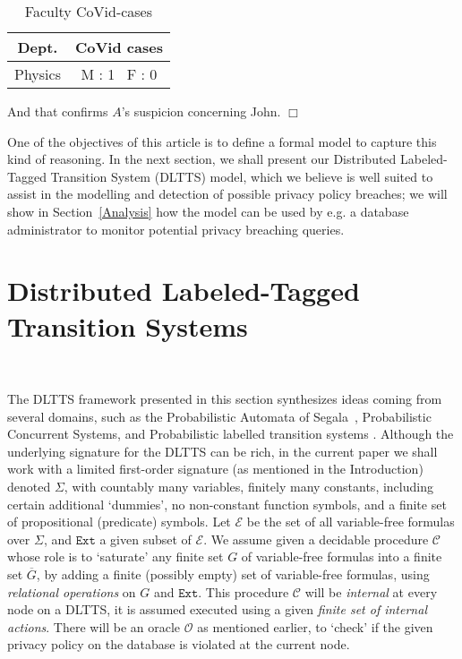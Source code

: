 \documentclass[pdflatex]{article}
\def \C {{\mathcal{C}}}
\def \E {{\mathcal{E}}}
\def \o {{\mathcal{O}}}
\def \lft {\noindent}
\def \ovr {\overline}
\begin{document}
\begin{table}[h]
   \centering
    \begin{tabular}{| c| c|}
  \hline
  Dept. & CoVid cases  \\
  \hline
      Physics  & M : 1  \, F : 0\\
   \hline
   \end{tabular}
    \caption{\label{3} Faculty CoVid-cases}
   \end{table}
    
 \vspace*{-1em}\lft
And that confirms $A$'s suspicion concerning John.    \hfill $\Box$

\vspace*{1mm}
One of the objectives of this article is to define a formal model to capture this kind of
reasoning. In the next section, we  shall present our Distributed Labeled-Tagged Transition
System (DLTTS) model, which we  believe   is well suited to assist in the modelling and
detection of possible privacy policy breaches; we will show in Section~\ref{Analysis} how
the model can be used by e.g. a database administrator to monitor potential privacy
breaching queries.

 \vspace*{-1em}
 \section{{\large Distributed Labeled-Tagged Transition Systems}}~\label{DLTTS}
 \vspace*{-1.5em}
 
 The DLTTS framework presented in this section synthesizes ideas  coming from 
 several domains, such as the Probabilistic Automata  of Segala~\cite{Segala95b},
 Probabilistic Concurrent  Systems,  and Probabilistic labelled transition systems 
\cite{Fast2018,PTS2019}. Although the  underlying signature for the DLTTS can be
 rich, in the  current paper we shall work with a  limited first-order signature (as
 mentioned in the Introduction) denoted $\Sigma$, with countably many variables,
 finitely many  constants, including certain additional  `dummies', no non-constant
 function symbols,  and  a finite set of propositional (predicate)  symbols.
 Let  $\E$ be the set of all  variable-free formulas  over $\Sigma$, and $\mathtt{Ext}$
 a given subset of $\E$. We assume given a  decidable  procedure $\C$ whose role
 is to `saturate'  any finite set $G$ of  variable-free formulas  into a finite set
 $\ovr{G}$, by adding a finite  (possibly empty) set of variable-free 
formulas, using   {\em  relational  operations} on  $G$ and $\mathtt{Ext}$. This 
procedure $\C$ will be  {\em  internal} at every node on a DLTTS, it is assumed
executed using a given {\em finite set of internal actions}. There will 
be an oracle  $\o$ as mentioned earlier, to `check' if the given privacy policy
on the database is violated at the current node.
\end{document}
